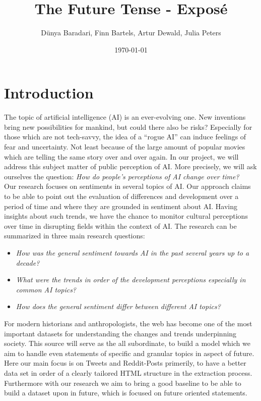 \documentclass{article}
\title{The Future Tense - Exposé}
\author{Dünya Baradari, Finn Bartels, Artur Dewald, Julia Peters}
\date{\today}
\begin{document}
\maketitle
\thispagestyle{empty}


\section{Introduction}
The topic of artificial intelligence (AI) is an ever-evolving one.
New inventions bring new possibilities for mankind, but could there also be risks?
Especially for those which are not tech-savvy, the idea of a “rogue AI” can induce feelings of fear and uncertainty.
Not least because of the large amount of popular movies which are telling the same story over and over again.
In our project, we will address this subject matter of public perception of AI.
More precisely, we will ask ourselves the question:
\textit{How do people’s perceptions of AI change over time?}
\\
Our research focuses on sentiments in several topics of AI.
Our approach claims to be able to point out the evaluation of differences and development over a period of time and where they are grounded in sentiment about AI.
Having insights about such trends, we have the chance to monitor cultural perceptions over time in disrupting fields within the context of AI.
The research can be summarized in three main research questions:

\begin{itemize}
\item \textit{How was the general sentiment towards AI in the past several years up to a decade?}
\item \textit{What were the trends in order of the development perceptions especially in common AI topics?}
\item \textit{How does the general sentiment differ between different AI topics?}
\end{itemize}
%
For modern historians and anthropologists, the web has become one of the most important datasets for understanding the changes and trends underpinning society.
This source will serve as the all subordinate, to build a model which we aim to handle even statements of specific and granular topics in aspect of future.
Here our main focus is on Tweets and Reddit-Posts primerily, to have a better data set in order of a clearly tailored HTML structure in the extraction process.
Furthermore with our research we aim to bring a good baseline to be able to build a dataset upon in future, which is focused on future oriented statements.
\end{document}
